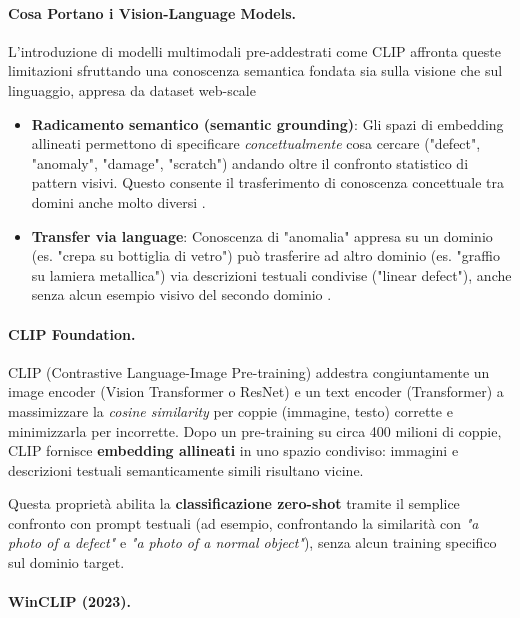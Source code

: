 \paragraph{Cosa Portano i Vision-Language Models.} L'introduzione di modelli multimodali pre-addestrati come CLIP \cite{radford2021learning} affronta queste limitazioni sfruttando una conoscenza semantica fondata sia sulla visione che sul linguaggio, appresa da dataset web-scale

\begin{itemize}
\item \textbf{Radicamento semantico (semantic grounding)}: Gli spazi di embedding allineati permettono di specificare \textit{concettualmente} cosa cercare ("defect", "anomaly", "damage", "scratch") andando oltre il confronto statistico di pattern visivi. Questo consente il trasferimento di conoscenza concettuale tra domini anche molto diversi \cite{zhou2024anomalyclip}.

\item \textbf{Transfer via language}: Conoscenza di "anomalia" appresa su un dominio (es. "crepa su bottiglia di vetro") può trasferire ad altro dominio (es. "graffio su lamiera metallica") via descrizioni testuali condivise ("linear defect"), anche senza alcun esempio visivo del secondo dominio \cite{jeong2023winclip}.

\end{itemize}

\paragraph{CLIP Foundation.}

CLIP (Contrastive Language-Image Pre-training) \cite{radford2021learning} addestra congiuntamente un image encoder (Vision Transformer o ResNet) e un text encoder (Transformer) a massimizzare la \textit{cosine similarity} per coppie (immagine, testo) corrette e minimizzarla per incorrette. Dopo un pre-training su circa 400 milioni di coppie, CLIP fornisce \textbf{embedding allineati} in uno spazio condiviso: immagini e descrizioni testuali semanticamente simili risultano vicine.

Questa proprietà abilita la \textbf{classificazione zero-shot} tramite il semplice confronto con prompt testuali (ad esempio, confrontando la similarità con \textit{"a photo of a defect"} e \textit{"a photo of a normal object"}), senza alcun training specifico sul dominio target.

\paragraph{WinCLIP (2023).}

